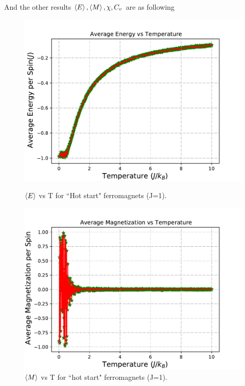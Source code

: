 \documentclass[12pt]{article}
\begin{document}
	And the other results $\braket{E},\braket{M},\chi,C_v$ are as following
	\begin{figure}[H]
		\begin{minipage}[t]{0.5\textwidth}
			\centering
			\includegraphics[scale=0.5]{ave E vs T (High, J=1).pdf}
			\setcaptionwidth{3in}
			\caption{$\braket{E}$ vs T for ``Hot start"  ferromagnets (J=1). }
			\label{fig: high start average energy}
		\end{minipage}
		\begin{minipage}[t]{0.5\textwidth}
			\centering
			\includegraphics[scale=0.5]{ave M vs T(High, J=1).pdf}
			\setcaptionwidth{3in}
			\caption{$\braket{M}$ vs T for ``hot start"  ferromagnets (J=1).}
			\label{fig: high start average magnetization}
		\end{minipage}
	\end{figure}
	
\end{document}
